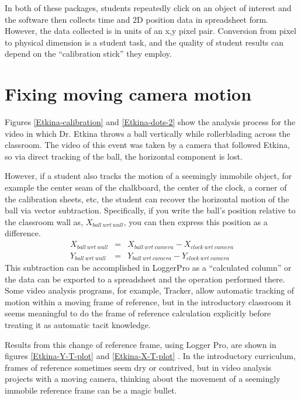 \documentclass[12pt]{iopart}
\newcommand{\bea}{\begin{eqnarray}}
\newcommand{\eea}{\end{eqnarray}}
\begin{document}
In both of these packages, students repeatedly click on an object of interest and the software then collects time and 2D position data  in spreadsheet form.  However, the data collected is in units of an x,y pixel pair.  Conversion from pixel to physical dimension is a student task, and the quality of student results can depend on the ``calibration stick''\cite{calibration_stick} they employ.

\section{Fixing moving camera motion} 
Figures \ref{Etkina-calibration} and \ref{Etkina-dots-2} show the analysis process for the video in which Dr. Etkina throws a ball vertically while rollerblading across the classroom.  The video of this event was taken by a camera that followed Etkina, so via direct tracking of the ball, the horizontal component is lost.

However, if a student also tracks the motion of a seemingly immobile object, for example the center seam of the chalkboard, the center of the clock, a corner of the calibration sheets, etc, the student can recover the horizontal motion of the ball via vector subtraction.  Specifically, if you write  the ball's position relative to the classroom wall as, $X_{ball~wrt~wall}$, you can then express this position as a difference.
\bea
X_{ball~wrt~wall} &=& X_{ball~wrt~camera}-X_{clock~wrt~camera} \nonumber\\ 
Y_{ball~wrt~wall} &=& Y_{ball~wrt~camera}-Y_{clock~wrt~camera}\nonumber
\eea
This subtraction can be accomplished in LoggerPro as a ``calculated column'' or the data can be exported to a spreadsheet and the operation performed there.  Some video analysis programs, for example, Tracker, allow automatic tracking of motion within a moving frame of reference\cite{tracker_planets}, but in the introductory classroom it seems meaningful to do the frame of reference calculation explicitly before treating it as automatic tacit knowledge.

Results from this change of reference frame, using Logger Pro, are shown in figures \ref{Etkina-Y-T-plot} and \ref{Etkina-X-T-plot} . 
In the introductory curriculum, frames of reference sometimes seem dry or contrived, but in video analysis projects with a moving camera, thinking about the movement of a seemingly immobile reference frame can be a magic bullet.  
\end{document}
